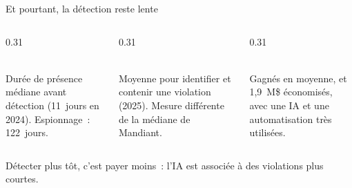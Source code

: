 \begin{frame}{Et pourtant, la détection reste lente}
  \begin{columns}[T]
    \begin{column}{0.31\textwidth}
      \begin{carte}[height=3.4cm,valign=top]
        \,\\[0.25cm]
        Durée de présence médiane avant détection (11~jours en 2024).
        Espionnage~: 122~jours.
      \end{carte}
    \end{column}
    \begin{column}{0.31\textwidth}
      \begin{carte}[height=3.4cm,valign=top]
        \,\\[0.25cm]
        Moyenne pour identifier et contenir une violation (2025).
        Mesure différente de la médiane de Mandiant.
      \end{carte}
    \end{column}
    \begin{column}{0.31\textwidth}
      \begin{carte}[height=3.4cm,valign=top]
        \,\\[0.25cm]
        Gagnés en moyenne, et 1,9~M\$ économisés, avec une IA et une automatisation
        très utilisées.
      \end{carte}
    \end{column}
  \end{columns}
  \vspace{0.4cm}
  \begin{pointcle}
    \centering
    Détecter plus tôt, c'est payer moins~: l'IA est associée à des violations plus courtes.
  \end{pointcle}
\end{frame}

